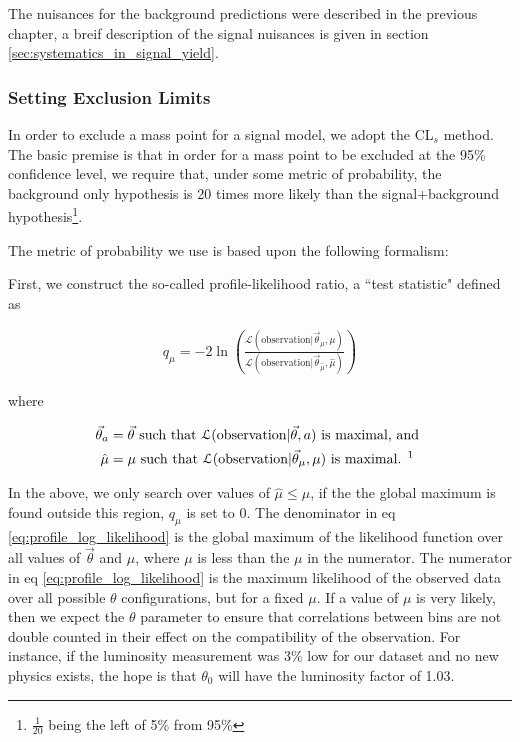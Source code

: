      The nuisances for the background predictions were described in the previous chapter, a breif description of the signal nuisances is given in section \ref{sec:systematics_in_signal_yield}.
    \subsubsection{Setting Exclusion Limits} \label{sec:setting_exclusion_limits}

      In order to exclude a mass point for a signal model, we adopt the CL$_s$ method. The basic premise is that in order for a mass point to be excluded at the 95\% confidence level, we require that, under some metric of probability, the background only hypothesis is 20 times more likely than the signal+background hypothesis\footnote{$\frac{1}{20}$ being the left of 5\% from 95\%}.

      The metric of probability we use is based upon the following formalism: 

      First, we construct the so-called profile-likelihood ratio, a ``test statistic" defined as

      \begin{align} \label{eq:profile_log_likelihood}
        q_\mu = -2 \ln \left( \frac{\mathcal{L}(\text{observation} | \vec{\theta}_{\mu}, \mu)}{\mathcal{L}(\text{observation} | \vec{\theta}_{\hat{\mu}}, \hat{\mu})} \right)
      \end{align}

      where

      \begin{align*}
        \vec{\theta}_a &= \vec{\theta} \text{ such that } \mathcal{L}(\text{observation} | \vec{\theta}, a) \text{ is maximal, and } \\
        \hat{\mu} &= \mu \text{ such that } \mathcal{L}(\text{observation} | \vec{\theta}_\mu, \mu) \text{ is maximal. \footnotemark{} }
      \end{align*}
      
       In the above, we only search over values of $\hat{\mu} \le \mu$, if the the global maximum is found outside this region, $q_\mu$ is set to 0. The denominator in eq \ref{eq:profile_log_likelihood} is the global maximum of the likelihood function over all values of $\vec{\theta}$ and $\mu$, where $\mu$ is less than the $\mu$ in the numerator. The numerator in eq \ref{eq:profile_log_likelihood} is the maximum likelihood of the observed data over all possible $\theta$ configurations, but for a fixed $\mu$. If a value of $\mu$ is very likely, then we expect the $\theta$ parameter to ensure that correlations between bins are not double counted in their effect on the compatibility of the observation. For instance, if the luminosity measurement was 3\% low for our dataset and no new physics exists, the hope is that $\theta_0$ will have the luminosity factor of 1.03.

